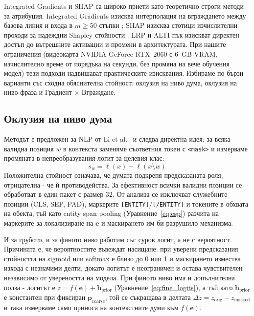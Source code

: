 \documentclass[12pt,a4paper]{report}
\begin{document}
Integrated Gradients и SHAP са широко приети като теоретично строги методи за атрибуция. Integrated Gradients изисква интерполация на вграждането между базова линия и входа в $m \geq 50$ стъпки \cite{sundararajan2017ig}; SHAP изисква стотици изчислителни проходи за надеждни Shapley стойности \cite{lundberg2017shap}. LRP и ALTI пък изискват директен достъп до вътрешните активации и промени в архитектурата. При нашите ограничения (видеокарта NVIDIA GeForce RTX~2060 с 6~GB VRAM, изчислително време от порядъка на секунди, без промяна на вече обучения модел) тези подходи надвишават практическите изисквания. Избираме по-бързи варианти със сходна обяснителна стойност: оклузия на ниво дума, оклузия на ниво фраза и Градиент $\times$ Вграждане.


\subsection{Оклузия на ниво дума}
\label{sec:occlusion_word}

Методът е предложен за NLP от Li et al.\ \cite{li2016visualizing} и следва директна идея: за всяка валидна позиция $w$ в контекста заменяме съответния токен с \texttt{<mask>} и измерваме промяната в непреобразувания логит за целевия клас:
\begin{equation}
  s_w = \ell(x) - \ell(x \setminus w)
  \label{eq:occlusion}
\end{equation}
Положителна стойност означава, че думата подкрепя предсказаната роля; отрицателна - че ѝ противодейства. За ефективност всички валидни позиции се обработват в един пакет с размер 32. От анализа се изключват служебните позиции (CLS, SEP, PAD), маркерите \texttt{[ENTITY]}/\texttt{[/ENTITY]} и токените в обхвата на обекта, тъй като entity span pooling (Уравнение~\ref{eq:esp}) разчита на маркерите за локализиране на $\mathbf{e}$ и маскирането им би разрушило механизма.

И за грубото, и за финото ниво работим със суров логит, а не с вероятност. Причината е, че вероятностите въвеждат насищане: при уверени предсказания стойността на sigmoid или softmax е близо до 0 или 1 и маскирането измества изхода с незначими делти, докато логитът е неограничен и остава чувствителен независимо от увереността на модела. При финото ниво има и допълнителна полза - логитът е $z = f(\mathbf{e}) + \mathbf{h}_{\text{prior}}$ (Уравнение~\ref{eq:fine_logits}), а тъй като $\mathbf{h}_{\text{prior}}$ е константен при фиксиран $\mathbf{p}_{\text{coarse}}$, той се съкращава в делтата $\Delta z = z_{\text{orig}} - z_{\text{masked}}$ и така измерваме само приноса на контекстните думи към $f(\mathbf{e})$.
\end{document}
